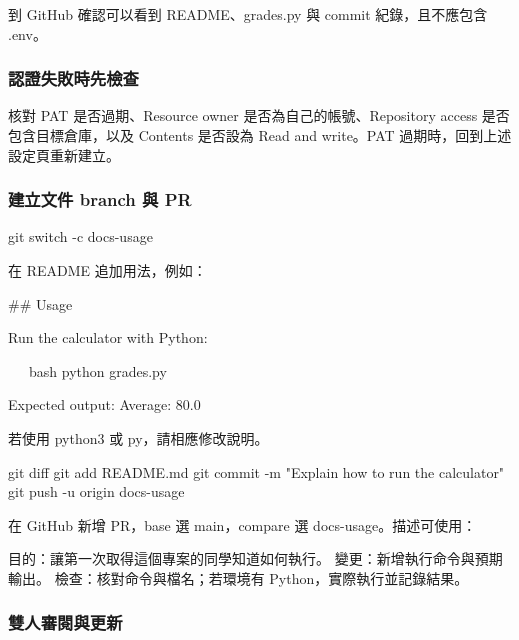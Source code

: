 \documentclass[11pt,a4paper]{article}
\DeclareRobustCommand{\code}[1]{{\small\ttfamily #1}}
\begin{document}
到 GitHub 確認可以看到 README、\code{grades.py} 與 commit 紀錄，且不應包含 \code{.env}。

\subsubsection{認證失敗時先檢查}

核對 PAT 是否過期、Resource owner 是否為自己的帳號、Repository access 是否包含目標倉庫，以及 Contents 是否設為 Read and write。PAT 過期時，回到上述設定頁重新建立。

\subsubsection{建立文件 branch 與 PR}

\begin{Code}
git switch -c docs-usage
\end{Code}

在 README 追加用法，例如：

\begin{Code}
## Usage

Run the calculator with Python:

~~~bash
python grades.py
~~~

Expected output: Average: 80.0
\end{Code}

若使用 \code{python3} 或 \code{py}，請相應修改說明。

\begin{Code}
git diff
git add README.md
git commit -m "Explain how to run the calculator"
git push -u origin docs-usage
\end{Code}

在 GitHub 新增 PR，base 選 \code{main}，compare 選 \code{docs-usage}。描述可使用：

\begin{Code}
目的：讓第一次取得這個專案的同學知道如何執行。
變更：新增執行命令與預期輸出。
檢查：核對命令與檔名；若環境有 Python，實際執行並記錄結果。
\end{Code}

\subsubsection{雙人審閱與更新}
\end{document}
